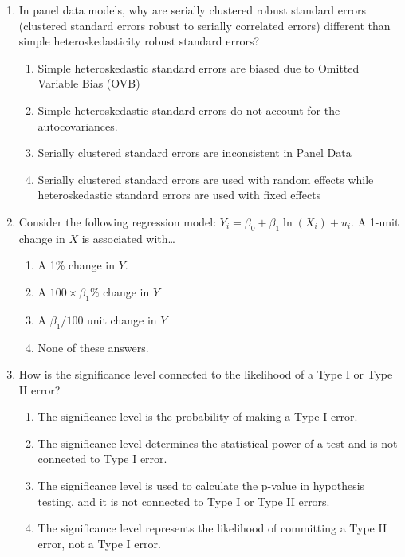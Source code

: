 \documentclass{article}
\begin{document}
\begin{enumerate}
\item In panel data models, why are serially clustered robust standard errors (clustered standard errors robust to serially correlated errors) different than simple heteroskedasticity robust standard errors?


\begin{enumerate}[label=\alph*)]
        \item Simple heteroskedastic standard errors are biased due to Omitted Variable Bias (OVB)
        \item Simple heteroskedastic standard errors do not account for the autocovariances. %
        \item Serially clustered standard errors are inconsistent in Panel Data
        \item Serially clustered standard errors are used with random effects while heteroskedastic standard errors are used with fixed effects
\end{enumerate}\vspace{.25cm}


\item Consider the following regression model: $Y_i = \beta_0 + \beta_1 \ln(X_i) + u_i$. A 1-unit change in $X$ is associated with…
\begin{enumerate}[label=\alph*)]
        \item A 1\% change in $Y$.
        \item A $100 \times \beta_1 \%$ change in $Y$
        \item A $\beta_1/100$ unit change in $Y$
        \item None of these answers.
\end{enumerate}\vspace{.25cm}


\item How is the significance level connected to the likelihood of a Type I or Type II error?

\begin{enumerate}[label=\alph*)]
  \item The significance level is the probability of making a Type I error.
  \item The significance level determines the statistical power of a test and is not connected to Type I error.
  \item The significance level is used to calculate the p-value in hypothesis testing, and it is not connected to Type I or Type II errors.
  \item The significance level represents the likelihood of committing a Type II error, not a Type I error.
\end{enumerate}\vspace{.25cm}





\end{enumerate}
\end{document}
